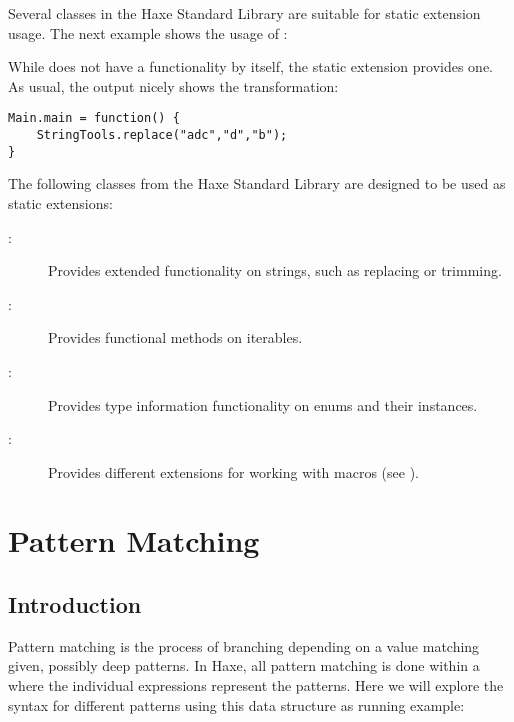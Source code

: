 Several classes in the Haxe Standard Library are suitable for static extension usage. The next example shows the usage of :


While  does not have a  functionality by itself, the  static extension provides one. As usual, the  output nicely shows the transformation:

\begin{lstlisting}
Main.main = function() {
	StringTools.replace("adc","d","b");
}
\end{lstlisting}

The following classes from the Haxe Standard Library are designed to be used as static extensions:

\begin{description}
	\item[:] Provides extended functionality on strings, such as replacing or trimming.
	\item[:] Provides functional methods on iterables.
	\item[:] Provides type information functionality on enums and their instances.
	\item[:] Provides different extensions for working with macros (see ).
\end{description}






\section{Pattern Matching}
\label{lf-pattern-matching}

\subsection{Introduction}
\label{lf-pattern-matching-introduction}

Pattern matching is the process of branching depending on a value matching given, possibly deep patterns. In Haxe, all pattern matching is done within a  where the individual  expressions represent the patterns. Here we will explore the syntax for different patterns using this data structure as running example:

